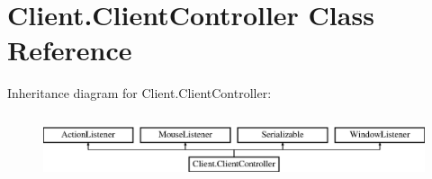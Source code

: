 \section{Client.\+Client\+Controller Class Reference}
\label{class_client_1_1_client_controller}
Inheritance diagram for Client.\+Client\+Controller\+:\begin{figure}[H]
\begin{center}
\leavevmode
\includegraphics[height=1.944445cm]{class_client_1_1_client_controller}
\end{center}
\end{figure}
